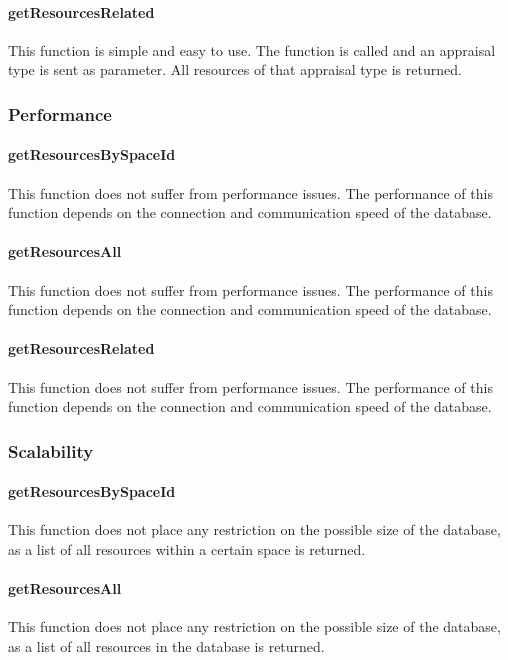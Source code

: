 \documentclass[a4paper]{article}
\begin{document}
\paragraph{getResourcesRelated}
This function is simple and easy to use. The function is called and an appraisal type is sent as parameter. All resources of that appraisal type is returned.

\subsubsection {Performance}

\paragraph{getResourcesBySpaceId}
This function does not suffer from performance issues. The performance of this function depends on the connection and communication speed of the database.

\paragraph{getResourcesAll}
This function does not suffer from performance issues. The performance of this function depends on the connection and communication speed of the database.

\paragraph{getResourcesRelated}
This function does not suffer from performance issues. The performance of this function depends on the connection and communication speed of the database.

\subsubsection {Scalability}

\paragraph{getResourcesBySpaceId}
This function does not place any restriction on the possible size of the database, as a list of all resources within a certain space is returned.

\paragraph{getResourcesAll}
This function does not place any restriction on the possible size of the database, as a list of all resources in the database is returned.
\end{document}
